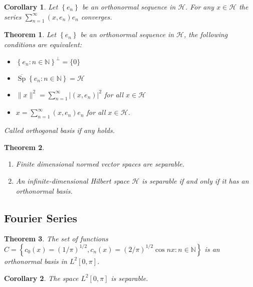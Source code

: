 \documentclass[10pt]{paper}
\newtheorem{theorem}{Theorem}[section]
\newtheorem{corollary}{Corollary}[section]
\begin{document}
\begin{corollary}
    Let $\left\{e_{n}\right\}$ be an orthonormal sequence in $\mathcal{H} .$ For any $x \in \mathcal{H}$ the series $\sum_{n=1}^{\infty}\left(x, e_{n}\right) e_{n}$ converges.
\end{corollary}

\begin{theorem}
    Let $\left\{e_{n}\right\}$ be an orthonormal sequence in $\mathcal{H}$, the following conditions are equivalent:
    \begin{itemize}
        \item $\left\{e_{n}: n \in \mathbb{N}\right\}^{\perp}=\{0\}$
        \item $\overline{\operatorname{Sp}}\left\{e_{n}: n \in \mathbb{N}\right\}=\mathcal{H}$
        \item $\|x\|^{2}=\sum_{n=1}^{\infty}\left|\left(x, e_{n}\right)\right|^{2}$ for all $x \in \mathcal{H}$
        \item $x=\sum_{n=1}^{\infty}\left(x, e_{n}\right) e_{n}$ for all $x \in \mathcal{H}$.
    \end{itemize}
    Called orthogonal basis if any holds.
\end{theorem}

\begin{theorem}
    \begin{enumerate}
        \item Finite dimensional normed vector spaces are separable.
        \item An infinite-dimensional Hilbert space $\mathcal{H}$ is separable if and only if it has an orthonormal basis.
    \end{enumerate}
\end{theorem}

\subsection{Fourier Series}

\begin{theorem}
    The set of functions $ C=\left\{c_{0}(x)=(1 / \pi)^{1 / 2}, c_{n}(x)=(2 / \pi)^{1 / 2} \cos n x: n \in \mathbb{N}\right\} $ is an orthonormal basis in $L^{2}[0, \pi]$.
\end{theorem}

\begin{corollary}
    The space $L^{2}[0, \pi]$ is separable.
\end{corollary}
\end{document}

